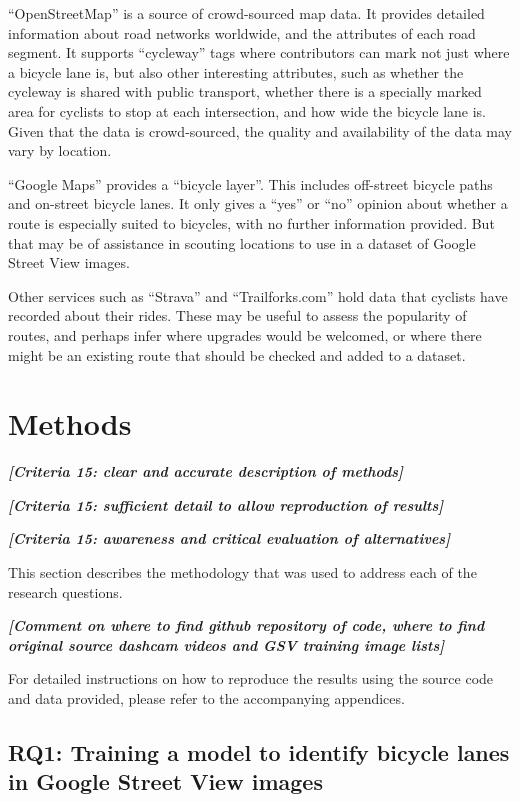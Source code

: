\documentclass[11pt,twoside]{report}
\newcommand{\remark}[1]{{\bf \em [\marginpar{$\Leftarrow$}#1]}}
\begin{document}
``OpenStreetMap'' \cite{OPENSTREETMAP} is a source of crowd-sourced map data.  It provides detailed information about road networks worldwide, and the attributes of each road segment.  It supports ``cycleway'' tags where contributors can mark not just where a bicycle lane is, but also other interesting attributes, such as whether the cycleway is shared with public transport, whether there is a specially marked area for cyclists to stop at each intersection, and how wide the bicycle lane is.  Given that the data is crowd-sourced, the quality and availability of the data may vary by location.

``Google Maps'' provides a ``bicycle layer''.  This includes off-street bicycle paths and on-street bicycle lanes.  It only gives a ``yes'' or ``no'' opinion about whether a route is especially suited to bicycles, with no further information provided.  But that may be of assistance in scouting locations to use in a dataset of Google Street View images.

Other services such as ``Strava'' and ``Trailforks.com'' hold data that cyclists have recorded about their rides.  These may be useful to assess the popularity of routes, and perhaps infer where upgrades would be welcomed, or where there might be an existing route that should be checked and added to a dataset.


\chapter{Methods}

\remark{Criteria 15: clear and accurate description of methods}

\remark{Criteria 15: sufficient detail to allow reproduction of results}

\remark{Criteria 15: awareness and critical evaluation of alternatives}

This section describes the methodology that was used to address each of the research questions.

\remark{Comment on where to find github repository of code, where to find original source dashcam videos and GSV training image lists}

For detailed instructions on how to reproduce the results using the source code and data provided, please refer to the accompanying appendices.

\section{RQ1: Training a model to identify bicycle lanes in Google Street View images}
\label{s:rq1}
\end{document}
